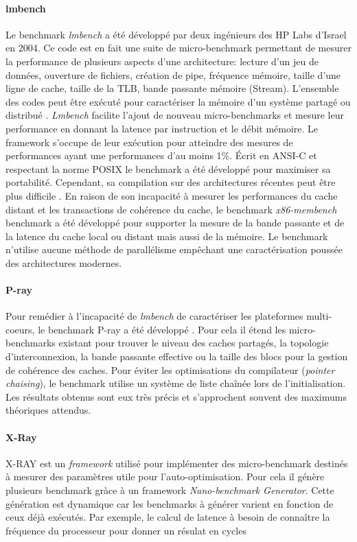     \paragraph{lmbench} 
        Le benchmark \textit{lmbench}\cite{Staelin2004} a été développé par deux ingénieurs des HP Labs d'Israel en 2004. Ce code est en fait une suite de micro-benchmark permettant de mesurer la performance de plusieurs aspects d'une architecture: lecture d'un jeu de données, ouverture de fichiers, création de pipe, fréquence mémoire, taille d'une ligne de cache, taille de la TLB, bande passante mémoire (Stream). L'ensemble des codes peut être exécuté pour caractériser la mémoire d'un système partagé ou distribué \cite{Staelin2002}.
        \textit{Lmbench} facilite l'ajout de nouveau micro-benchmarks et mesure leur performance en donnant la latence par instruction et le débit mémoire. Le framework s'occupe de leur exécution pour atteindre des mesures de performances ayant une performances d'au moins 1\%. Écrit en ANSI-C et respectant la norme POSIX le benchmark a été développé pour maximiser sa portabilité. Cependant, sa compilation sur des architectures récentes peut être plus difficile \cite{Yotov2004}. En raison de son incapacité à mesurer les performances du cache distant et les transactions de cohérence du cache, le benchmark \textit{x86-membench} benchmark \cite{Molka2017b} a été développé pour supporter la mesure de la bande passante et de la latence du cache local ou distant mais aussi de la mémoire. Le benchmark n'utilise aucune méthode de parallélisme empêchant une caractérisation poussée des architectures modernes. 
        
    
    \paragraph{P-ray} 
        Pour remédier à l'incapacité de \textit{lmbench} de caractériser les plateformes multi-coeurs, le benchmark P-ray a été développé \cite{Duchateau2008}. Pour cela il étend les micro-benchmarks existant pour trouver le niveau des caches partagés, la topologie d’interconnexion, la bande passante effective ou la taille des blocs pour la gestion de cohérence des caches. Pour éviter les optimisations du compilateur (\textit{pointer chaising}), le benchmark utilise un système de liste chaînée lors de l'initialisation. Les résultats obtenus sont eux très précis et s'approchent souvent des maximums théoriques attendus.

    \paragraph{X-Ray} X-RAY \cite{Yotov2004} est un \textit{framework} utilisé pour implémenter des micro-benchmark destinés à mesurer des paramètres utile pour l’auto-optimisation. Pour cela il génère plusieurs benchmark gràce à un framework \textit{Nano-benchmark Generator}. Cette génération est dynamique car les benchmarks à générer varient en fonction de ceux déjà exécutés. Par exemple, le calcul de latence à besoin de connaître la fréquence du processeur pour donner un résulat en cycles

